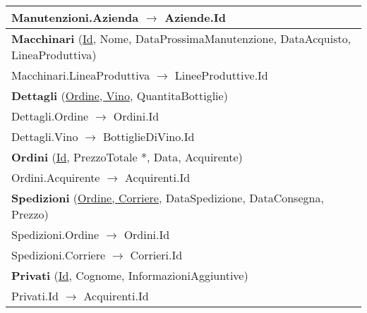 \begin{center}
\begin{minipage}[t]{7.5cm}
{\begin{tabular}{P{7.5cm}}
				\midrule
				Manutenzioni.Azienda $\to$ Aziende.Id                                                                                 \\                                
				\midrule
				 \textbf{Macchinari} (\underline{Id}, Nome, DataProssimaManutenzione, DataAcquisto, LineaProduttiva)                   \\
				\midrule
				Macchinari.LineaProduttiva $\to$ LineeProduttive.Id                                                                                                    \\                                
				\midrule
				 \textbf{Dettagli} (\underline{Ordine, Vino}, QuantitaBottiglie)                      \\
				\midrule
				Dettagli.Ordine $\to$ Ordini.Id                                                                                       \\
				\midrule
				Dettagli.Vino $\to$ BottiglieDiVino.Id                                                                                \\                                
				\midrule
				 \textbf{Ordini} (\underline{Id}, PrezzoTotale *, Data, Acquirente)                                                    \\
				\midrule
				Ordini.Acquirente $\to$ Acquirenti.Id                                                                                                                  \\                                
				\midrule
				 \textbf{Spedizioni} (\underline{Ordine, Corriere}, DataSpedizione, DataConsegna, Prezzo)                              \\
				\midrule
				Spedizioni.Ordine $\to$ Ordini.Id                                                                                                                      \\
				\midrule
				Spedizioni.Corriere $\to$ Corrieri.Id                                                                                                                  \\                                
				\midrule
				 \textbf{Privati} (\underline{Id}, Cognome, InformazioniAggiuntive)                                                    \\
				\midrule
				Privati.Id $\to$ Acquirenti.Id                                                                                                                         \\

\end{tabular}}
\end{minipage}
\end{center}
